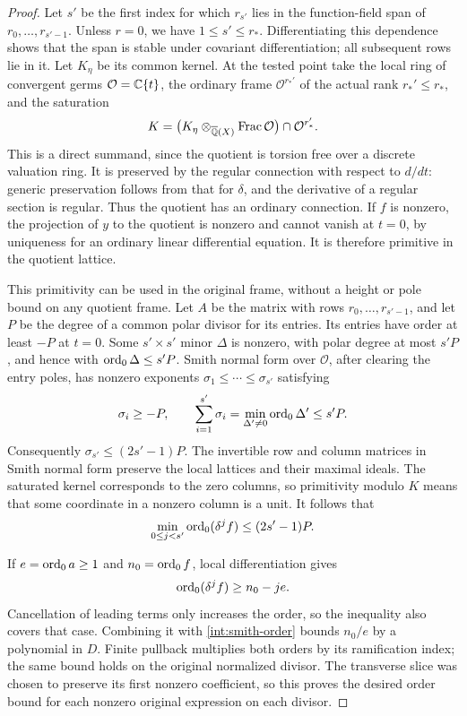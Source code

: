 \begin{proof}
Let $s'$ be the first index for which $r_{s'}$ lies in the function-field
span of $r_0,\ldots,r_{s'-1}$.  Unless $r=0$, we have $1\leq s'\leq r_*$.
Differentiating this dependence shows that the span is stable under
covariant differentiation; all subsequent rows lie in it.  Let $K_\eta$
be its common kernel.  At the tested point take the local ring of
convergent germs $\mathcal O=\mathbb C\{t\}$, the ordinary frame
$\mathcal O^{r_*'}$ of the actual rank $r_*'\leq r_*$, and the
saturation
\[
K=\bigl(K_\eta\otimes_{\overline{\mathbb Q}(X)}\operatorname{Frac}\mathcal O\bigr)
       \cap\mathcal O^{r_*'}.
\]
This is a direct summand, since the quotient is torsion free over a
discrete valuation ring.  It is preserved by the regular connection
with respect to $d/dt$: generic preservation follows from that for
$\delta$, and the derivative of a regular section is regular.  Thus
the quotient has an ordinary connection.  If $f$ is nonzero, the
projection of $y$ to the quotient is nonzero and cannot vanish at
$t=0$, by uniqueness for an ordinary linear differential equation.
It is therefore primitive in the quotient lattice.

This primitivity can be used in the original frame, without a height
or pole bound on any quotient frame.  Let $A$ be the matrix with rows
$r_0,\ldots,r_{s'-1}$, and let $P$ be the degree of a common polar
divisor for its entries.  Its entries have order at least $-P$ at
$t=0$.  Some $s'\times s'$ minor $\Delta$ is nonzero, with polar
degree at most $s'P$, and hence with
$\operatorname{ord}_0\Delta\leq s'P$.  Smith normal form over $\mathcal O$, after
clearing the entry poles, has nonzero exponents
$\sigma_1\leq\cdots\leq\sigma_{s'}$ satisfying
\[
 \sigma_i\geq-P,\qquad
 \sum_{i=1}^{s'}\sigma_i
   =\min_{\Delta'\ne0}\operatorname{ord}_0\Delta'
   \leq s'P.
\]
Consequently $\sigma_{s'}\leq(2s'-1)P$.  The invertible row and column
matrices in Smith normal form preserve the local lattices and their
maximal ideals.  The saturated kernel corresponds to the zero columns,
so primitivity modulo $K$ means that some coordinate in a nonzero
column is a unit.  It follows that
\begin{equation}\label{int:smith-order}
 \min_{0\leq j<s'}\operatorname{ord}_0(\delta^j f)
   \leq (2s'-1)P.
\end{equation}

If $e=\operatorname{ord}_0 a\geq1$ and $n_0=\operatorname{ord}_0 f$, local differentiation gives
\[
 \operatorname{ord}_0(\delta^j f)\geq n_0-je.
\]
Cancellation of leading terms only increases the order, so the
inequality also covers that case.  Combining it with
\eqref{int:smith-order} bounds $n_0/e$ by a polynomial in $D$.
Finite pullback multiplies both orders by its ramification index;
the same bound holds on the original normalized divisor.  The
transverse slice was chosen to preserve its first nonzero coefficient,
so this proves the desired order bound for each nonzero original
expression on each divisor.


\end{proof}
